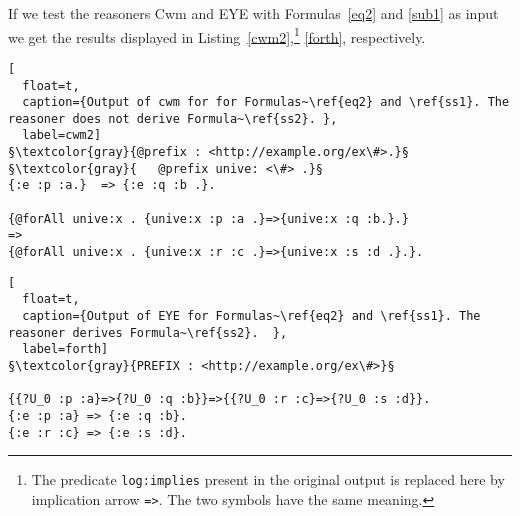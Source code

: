 If we test the reasoners Cwm and EYE with Formulas~\ref{eq2} and \ref{sub1} as input we get the results displayed in Listing~\ref{cwm2},\footnote{The 
predicate \texttt{log:implies} present in the original output is replaced here by implication arrow \texttt{=>}. The two symbols have the same meaning.} \ref{forth}, respectively.
\begin{lstlisting}[
  float=t,
  caption={Output of cwm for for Formulas~\ref{eq2} and \ref{ss1}. The reasoner does not derive Formula~\ref{ss2}. },
  label=cwm2]  
§\textcolor{gray}{@prefix : <http://example.org/ex\#>.}§
§\textcolor{gray}{   @prefix unive: <\#> .}§
{:e :p :a.}  => {:e :q :b .}.

{@forAll unive:x . {unive:x :p :a .}=>{unive:x :q :b.}.} 
=> 
{@forAll unive:x . {unive:x :r :c .}=>{unive:x :s :d .}.}.
\end{lstlisting}
\begin{lstlisting}[
  float=t,
  caption={Output of EYE for Formulas~\ref{eq2} and \ref{ss1}. The reasoner derives Formula~\ref{ss2}.  },
  label=forth]  
§\textcolor{gray}{PREFIX : <http://example.org/ex\#>}§

{{?U_0 :p :a}=>{?U_0 :q :b}}=>{{?U_0 :r :c}=>{?U_0 :s :d}}.
{:e :p :a} => {:e :q :b}.
{:e :r :c} => {:e :s :d}.
\end{lstlisting}

